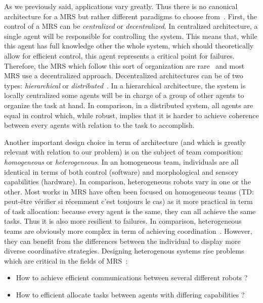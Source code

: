     As we previously said, applications vary greatly. Thus there is no canonical architecture for a MRS but rather different paradigms to choose from~\cite{Cao1997, Parker2008}. First, the control of a MRS can be \emph{centralized} or \emph{decentralized}. In centralized architecture, a single agent will be responsible for controlling the system. This means that, while this agent has full knowledge other the whole system, which should theoretically allow for efficient control, this agent represents a critical point for failures. Therefore, the MRS which follow this sort of organization are rare~\cite{Parker2008} and most MRS use a decentralized approach. Decentralized architectures can be of two types: \emph{hierarchical} or \emph{distributed}~\cite{Cao1997}. In a hierarchical architecture, the system is locally centralized some agents will be in charge of a group of other agents to organize the task at hand. In comparison, in a distributed system, all agents are equal in control which, while robust, implies that it is harder to achieve coherence between every agents with relation to the task to accomplish.

    Another important design choice in term of architecture (and which is greatly relevant with relation to our problem) is on the subject of team composition: \emph{homogeneous} or \emph{heterogeneous}. In an homogeneous team, individuals are all identical in terms of both control (software) and morphological and sensory capabilities (hardware). In comparison, heterogeneous robots vary in one or the other. Most works in MRS have often been focused on homogeneous teams (TD: peut-être vérifier si récemment c'est toujours le cas) as it more practical in term of task allocation: because every agent is the same, they can all achieve the same tasks. Thus it is also more resilient to failures. In comparison, heterogeneous teams are obviously more complex in term of achieving coordination~\cite{Parker1994}. However, they can benefit from the differences between the individual to display more diverse coordinative strategies. Designing heterogenous systems rise problems which are critical in the fields of MRS~\cite{Parker2008}:

    \begin{itemize}
      \item{How to achieve efficient communications between several different robots ?~\cite{Jung2000}}
      \item{How to efficient allocate tasks between agents with differing capabilities ?~\cite{Parker2003}}
    \end{itemize}

